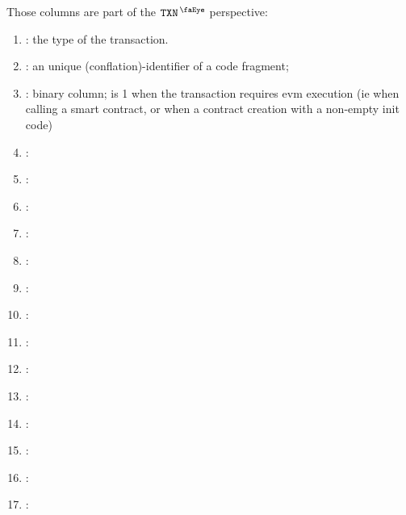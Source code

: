 Those columns are part of the $\isTxn$ perspective:
\begin{enumerate}[resume]
    \item \txType{}:
    the type of the transaction.
    \item \CFI{}: 
    an unique (conflation)-identifier of a code fragment;
    \item \txRequiresEvmExecution{}:
    binary column; is 1 when the transaction requires evm execution (ie when calling a smart contract, or when a contract creation with a non-empty init code)
    \item \isDep{}:
    \item \chainId{}:
    \item \nonce{}:
    \item \gasPrice{}: 
    \item \phaseMaxPriorityFeePerGas{}: 
    \item \maxFeePerGas{}: 
    \item \gasLimit{}: 
    \item \toHi{}:
    \item \toLo{}: 
    \item \value{}: 
    \item \dataSize{}:
    \item \dataCost{}:
    \item \nbWarmedAddress{}:
    \item \nbWarmedStorageKey{}:  
\end{enumerate}